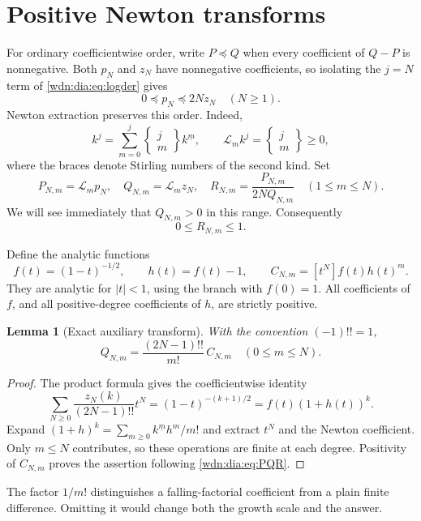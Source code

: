 \documentclass[11pt,letterpaper]{article}
\newtheorem{lemma}[theorem]{Lemma}
\theoremstyle{remark}\newtheorem{remark}[theorem]{Remark}
\newcommand{\LL}{\mathcal L}
\newcommand{\fall}[2]{#1^{\underline{#2}}}
\begin{document}
\section{Positive Newton transforms}
For ordinary coefficientwise order, write $P\preceq Q$ when every
coefficient of $Q-P$ is nonnegative. Both $p_N$ and $z_N$ have nonnegative
coefficients, so isolating the $j=N$ term of \eqref{wdn:dia:eq:logder} gives
\begin{equation}\label{wdn:dia:eq:order}
 0\preceq p_N\preceq2Nz_N\quad(N\ge1).
\end{equation}
Newton extraction preserves this order. Indeed,
\[
 k^j=\sum_{m=0}^j\left\{\begin{matrix}j\\m\end{matrix}\right\}\fall{k}{m},
 \qquad \LL_mk^j=\left\{\begin{matrix}j\\m\end{matrix}\right\}\ge0,
\]
where the braces denote Stirling numbers of the second kind. Set
\begin{equation}\label{wdn:dia:eq:PQR}
 P_{N,m}=\LL_mp_N,\quad Q_{N,m}=\LL_mz_N,\quad
 R_{N,m}=\frac{P_{N,m}}{2NQ_{N,m}}\quad(1\le m\le N).
\end{equation}
We will see immediately that $Q_{N,m}>0$ in this range. Consequently
\begin{equation}\label{wdn:dia:eq:Rbounds}
 0\le R_{N,m}\le1.
\end{equation}

Define the analytic functions
\begin{equation}\label{wdn:dia:eq:fh}
 f(t)=(1-t)^{-1/2},\qquad h(t)=f(t)-1,\qquad
 C_{N,m}=[t^N]f(t)h(t)^m.
\end{equation}
They are analytic for $|t|<1$, using the branch with $f(0)=1$. All coefficients
of $f$, and all positive-degree coefficients of $h$, are strictly positive.

\begin{lemma}[Exact auxiliary transform]\label{wdn:dia:lem:Q}
With the convention $(-1)!!=1$,
\begin{equation}\label{wdn:dia:eq:Q}
 Q_{N,m}=\frac{(2N-1)!!}{m!}\,C_{N,m}\quad(0\le m\le N).
\end{equation}
\end{lemma}
\begin{proof}
The product formula gives the coefficientwise identity
\[
 \sum_{N\ge0}\frac{z_N(k)}{(2N-1)!!}t^N
 =(1-t)^{-(k+1)/2}=f(t)(1+h(t))^k.
\]
Expand $(1+h)^k=\sum_{m\ge0}\fall{k}{m}h^m/m!$ and extract $t^N$ and
the Newton coefficient. Only $m\le N$ contributes, so these operations
are finite at each degree. Positivity of $C_{N,m}$ proves the assertion
following \eqref{wdn:dia:eq:PQR}.
\end{proof}
The factor $1/m!$ distinguishes a falling-factorial coefficient from a plain
finite difference. Omitting it would change both the growth scale and the
answer.
\end{document}
